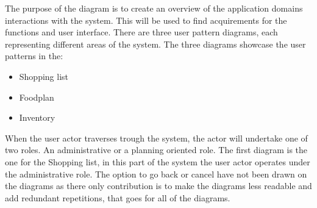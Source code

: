 The purpose of the diagram is to create an overview of the application domains interactions with the system. This will be used to find acquirements for the functions and user interface. There are three user pattern diagrams, each representing different areas of the system. The three diagrams showcase the user patterns in the:
\begin{itemize}
\item{Shopping list}
\item{Foodplan}
\item{Inventory}
\end{itemize}

When the user actor traverses trough the system, the actor will undertake one of two roles. An administrative or a planning oriented role.
The first diagram is the one for the Shopping list, in this part of the system the user actor operates under the administrative role.
The option to go back or cancel have not been drawn on the diagrams as there only contribution is to make the diagrams less readable and add redundant repetitions, that goes for all of the diagrams.

%


